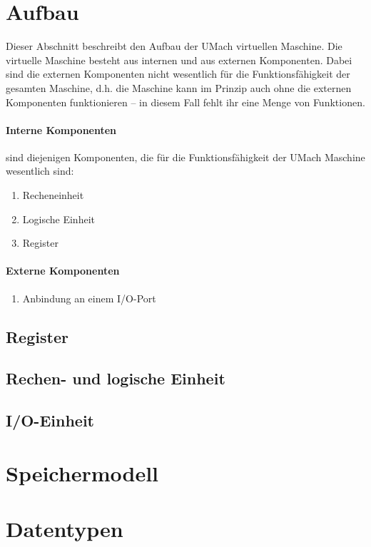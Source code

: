\section{Aufbau}
\label{sec:Aufbau}
Dieser Abschnitt beschreibt den Aufbau der UMach virtuellen Maschine.
Die virtuelle Maschine besteht aus internen und aus externen Komponenten. Dabei
sind die externen Komponenten nicht wesentlich für die Funktionsfähigkeit der
gesamten Maschine, d.h. die Maschine kann im Prinzip auch ohne die externen
Komponenten funktionieren -- in diesem Fall fehlt ihr eine Menge von Funktionen.

\paragraph{Interne Komponenten}
sind diejenigen Komponenten, die für die Funktionsfähigkeit der UMach
Maschine wesentlich sind:
\begin{enumerate}
  \item Recheneinheit
  \item Logische Einheit
  \item Register
\end{enumerate}


\paragraph{Externe Komponenten}

\begin{enumerate}
  \item Anbindung an einem I/O-Port
\end{enumerate}


\subsection{Register}
\blindtext

\subsection{Rechen- und logische Einheit}
\blindtext

\subsection{I/O-Einheit}
\blindtext



\section{Speichermodell}
\blindtext

\section{Datentypen}
\blindtext


